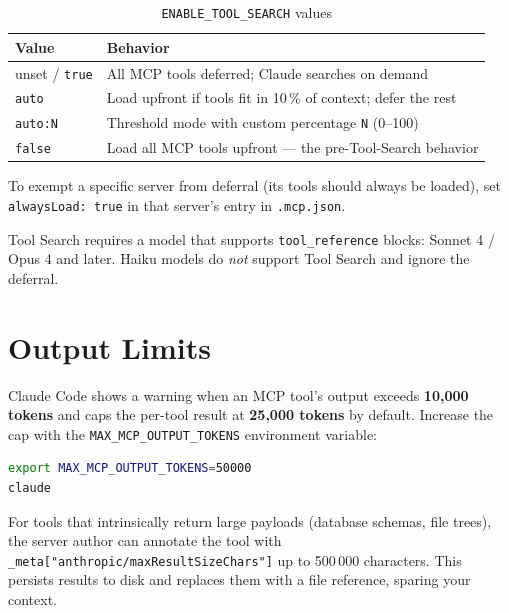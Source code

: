 \begin{table}[ht]
\centering
\caption{\texttt{ENABLE\_TOOL\_SEARCH} values}
\label{tab:tool-search}
\begin{tabularx}{\textwidth}{lX}
\toprule
\textbf{Value} & \textbf{Behavior} \\
\midrule
unset / \texttt{true} & All MCP tools deferred; Claude searches on demand \\
\texttt{auto}        & Load upfront if tools fit in 10\,\% of context; defer the rest \\
\texttt{auto:N}      & Threshold mode with custom percentage \texttt{N} (0--100) \\
\texttt{false}       & Load all MCP tools upfront — the pre-Tool-Search behavior \\
\bottomrule
\end{tabularx}
\end{table}

To exempt a specific server from deferral (its tools should always be
loaded), set \texttt{alwaysLoad: true} in that server's entry in
\texttt{.mcp.json}.

\begin{notebox}
Tool Search requires a model that supports \texttt{tool\_reference} blocks:
Sonnet 4 / Opus 4 and later. Haiku models do \emph{not} support Tool
Search and ignore the deferral.
\end{notebox}

\section{Output Limits}
\label{sec:mcp-output}


Claude Code shows a warning when an MCP tool's output exceeds
\textbf{10,000 tokens} and caps the per-tool result at \textbf{25,000
tokens} by default. Increase the cap with the
\texttt{MAX\_MCP\_OUTPUT\_TOKENS} environment variable:

\begin{lstlisting}[language=bash,caption={Raising the MCP output limit}]
export MAX_MCP_OUTPUT_TOKENS=50000
claude
\end{lstlisting}

For tools that intrinsically return large payloads (database schemas, file
trees), the server author can annotate the tool with
\texttt{\_meta["anthropic/maxResultSizeChars"]} up to 500\,000 characters.
This persists results to disk and replaces them with a file reference,
sparing your context.

